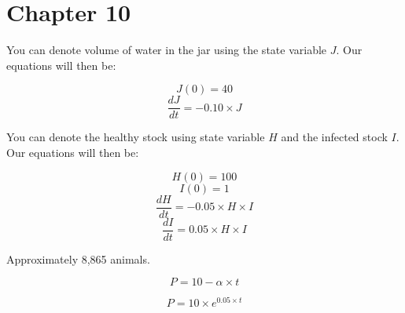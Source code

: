 \documentclass[]{memoir}
\begin{document}
\section{Chapter 10}


You can denote volume of water in the jar using the state variable $J$.
Our equations will then be:

\[ J(0) = 40 \] \[ \frac{dJ}{dt} = -0.10 \times J\]


You can denote the healthy stock using state variable $H$ and the
infected stock $I$. Our equations will then be:

\[ H(0) = 100 \] \[ I(0) = 1 \]
\[ \frac{dH}{dt} = -0.05 \times H \times I \]
\[ \frac{dI}{dt} = 0.05 \times H \times I \]


Approximately 8,865 animals.


\[ P = 10 - \alpha \times t\]


\[ P = 10 \times e^{0.05\times t}\]

\end{document}
